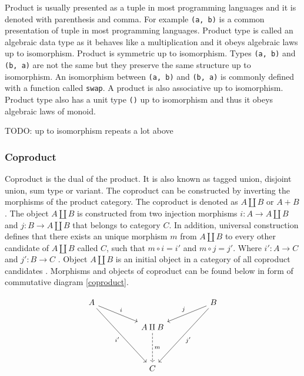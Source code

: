 \documentclass[article]{aaltoseries}
\begin{document}
    Product is usually presented as a tuple in most programming languages and it
    is denoted with parenthesis and comma. For example \lstinline|(a, b)| is a
    common presentation of tuple in most programming languages. Product type is
    called an algebraic data type as it behaves like a multiplication and it
    obeys algebraic laws up to isomorphism. Product is symmetric up to
    isomorphism. Types \lstinline|(a, b)| and \lstinline|(b, a)| are not the
    same but they preserve the same structure up to isomorphism. An isomorphism
    between \lstinline|(a, b)| and \lstinline|(b, a)| is commonly defined with a
    function called \lstinline|swap|. A product is also associative up to
    isomorphism. Product type also has a unit type \lstinline|()| up to
    isomorphism and thus it obeys algebraic laws of monoid.

    TODO: up to isomorphism repeats a lot above


  \subsubsection{Coproduct}
    Coproduct is the dual of the product. It is also known as tagged union,
    disjoint union, sum type or variant. The coproduct can be constructed by
    inverting the morphisms of the product category. The coproduct is denoted as
    $A \amalg B$ or $A + B$. The object $A \amalg B$ is constructed from two
    injection morphisms $i : A \rightarrow A \amalg B$ and $j : B \rightarrow A
    \amalg B$ that belongs to category $C$. In addition, universal construction
    defines that there exists an unique morphism $m$ from $A \amalg B$ to every
    other candidate of $A \amalg B$ called $C$, such that $m \circ i = i'$ and
    $m \circ j = j'$. Where $i' : A \rightarrow C$ and $j' : B \rightarrow C$
    \cite{barr1990category, pierce1991basic}. Object $A \amalg B$ is an initial
    object in a category of all coproduct candidates \cite{pierce1991basic}.
    Morphisms and objects of coproduct can be found below in form of commutative
    diagram \ref{coproduct}.

    \begin{equation}
      \label{coproduct}
      \begin{tikzcd}[row sep=huge, column sep=huge]
        A \arrow[dr, "i"]
        \arrow[ddr, "i'"']
        &
        & B \arrow[dl, "j"']
        \arrow[ddl, "j'"] \\
        [-2em] & A \amalg B \arrow[d, dashed, "m"]
        & \\
        & C
        &
      \end{tikzcd}
    \end{equation}
\end{document}
